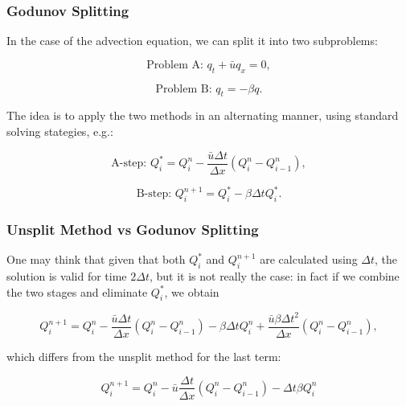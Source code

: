 \documentclass{beamer}
\renewcommand{\d}{\Delta}
\begin{document}
\begin{frame}
	\frametitle{Godunov Splitting}
	In the case of the advection equation, we can split it into two subproblems:

	\begin{equation}\label{eq:probA}
		\text{Problem A: } q_t+\bar{u}q_x=0,
	\end{equation}

	\begin{equation}\label{eq:probB}
		\text{Problem B: } q_t = -\beta q.
	\end{equation}

	The idea is to apply the two methods in an alternating manner, using standard solving stategies, e.g.:

	\begin{equation}\label{eq:stepA}
		\text{A-step: } Q_i^* = Q_i^n - \frac{\bar{u}\d t}{\d x} (Q_i^n-Q_{i-1}^n),
	\end{equation}

	\begin{equation}\label{eq:stepB}
		\text{B-step: } Q_i^{n+1} = Q_i^*-\beta\d tQ_i^*.
	\end{equation}

\end{frame}

\begin{frame}
	\frametitle{Unsplit Method vs Godunov Splitting}

	One may think that given that both $Q_i^*$ and $Q_i^{n+1}$ are calculated using $\d t$, the solution is valid for time $2\d t$, but it is not really the case: in fact if we combine the two stages and eliminate $Q_i^*$, we obtain

	\begin{equation*}
		Q_i^{n+1} = Q_i^n -\frac{\bar{u}\d t}{\d x}(Q_i^n-Q_{i-1}^n)-\beta\d tQ_i^n +\frac{\bar{u}\beta\d t^2}{\d x}(Q_i^n-Q_{i-1}^n),
	\end{equation*}

	which differs from the unsplit method for the last term:

	\begin{equation*}
		Q^{n+1}_i = Q^n_i-\bar{u} \frac{\d t}{\d x}(Q^n_i-Q^n_{i-1})-\d t\beta Q^n_i
	\end{equation*}

\end{frame}
\end{document}
